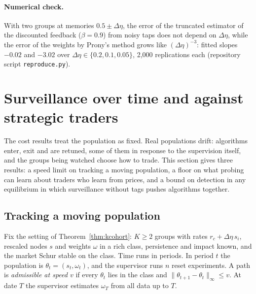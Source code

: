\documentclass[12pt]{article}
\theoremstyle{definition}
\theoremstyle{remark}
\begin{document}
\paragraph{Numerical check.} With two groups at memories $0.5\pm\Delta\eta$, the error of the truncated estimator of the discounted feedback ($\beta=0.9$) from noisy taps does not depend on $\Delta\eta$, while the error of the weights by Prony's method grows like $(\Delta\eta)^{-3}$: fitted slopes $-0.02$ and $-3.02$ over $\Delta\eta\in\{0.2,0.1,0.05\}$, 2,000 replications each (repository script \nolinkurl{reproduce.py}).

\section{Surveillance over time and against strategic traders}\label{app:dynamic}

The cost results treat the population as fixed. Real populations drift: algorithms enter, exit and are retuned, some of them in response to the supervision itself, and the groups being watched choose how to trade. This section gives three results: a speed limit on tracking a moving population, a floor on what probing can learn about traders who learn from prices, and a bound on detection in any equilibrium in which surveillance without tags pushes algorithms together.

\subsection{Tracking a moving population}

Fix the setting of Theorem~\ref{thm:kcohort}: $K\ge2$ groups with rates $r_c+\Delta\eta\,s_i$, rescaled nodes $s$ and weights $\omega$ in a rich class, persistence and impact known, and the market Schur stable on the class. Time runs in periods. In period $t$ the population is $\theta_t=(s_t,\omega_t)$, and the supervisor runs $n$ reset experiments. A path is \emph{admissible at speed $v$} if every $\theta_t$ lies in the class and $\|\theta_{t+1}-\theta_t\|_\infty\le v$. At date $T$ the supervisor estimates $\omega_T$ from all data up to $T$.
\end{document}
